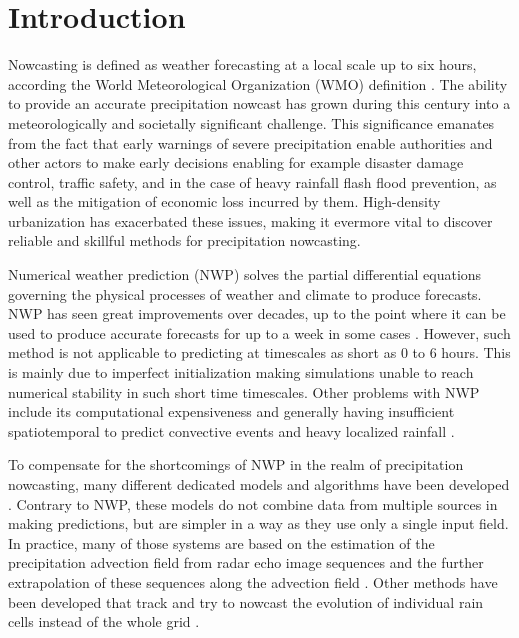 \chapter{Introduction}
\label{chapter:intro}


Nowcasting is defined as weather forecasting at a local scale up to six hours, according the World Meteorological Organization (WMO) definition \cite{schmid2019nowcasting}. The ability to provide an accurate precipitation nowcast has grown during this century into a meteorologically and societally significant challenge. This significance emanates from the fact that early warnings of severe precipitation enable authorities and other actors to make early decisions enabling for example disaster damage control, traffic safety, and in the case of heavy rainfall flash flood prevention, as well as the mitigation of economic loss incurred by them. High-density urbanization has exacerbated these issues, making it evermore vital to discover reliable and skillful methods for precipitation nowcasting. 

Numerical weather prediction (NWP) solves the partial differential equations governing the physical processes of weather and climate to produce forecasts. NWP has seen great improvements over decades, up to the point where it can be used to produce accurate forecasts for up to a week in some cases \cite{bauer_quiet_2015}. However, such method is not applicable to predicting at timescales as short as 0 to 6 hours. This is mainly due to imperfect initialization making simulations unable to reach numerical stability in such short time timescales. 
Other problems with NWP include its computational expensiveness and generally having insufficient spatiotemporal to predict convective events and heavy localized rainfall \cite{schultz_can_2021}. 



To compensate for the shortcomings of NWP in the realm of precipitation nowcasting, many different dedicated models and algorithms have been developed \cite{prudden_review_2020}. Contrary to NWP, these models do not combine data from multiple sources in making predictions, but are simpler in a way as they use only a single input field. In practice, many of those systems are based on the estimation of the precipitation advection field from radar echo image sequences and the further extrapolation of these sequences along the advection field \cite{prudden_review_2020, rinehart_three-dimensional_1978}. Other methods  have been developed that track and try to nowcast the evolution of individual rain cells instead of the whole grid \cite{prudden_review_2020, dixon1993titan}. 

